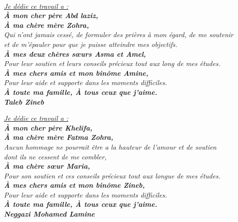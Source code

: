 \documentclass[12pt]{report}
\begin{document}
\newpage

\vspace*{0.1in}

\thispagestyle{empty}

\let\clearpage\relax

\begin{center}
    \textit{\fontsize{34}{46}{\bfseries{\color{Blue}{Dédicace}}}}
    \\
    \vspace{0.2in}
    \itshape
    \Large{\underline{Je dédie ce travail a :}}\\          \textbf{\large{À mon cher père Abd laziz,}}\\\vspace{-0.1in}
    \textbf{\large{À ma chère mère Zohra,}}\\
    \large{Qui n'ont jamais cessé, de formuler des prières à mon égard, de me soutenir\\\vspace{-0.1in}et de m'épauler pour que je puisse atteindre mes objectifs.}\\
    \textbf{\large{À mes deux chères sœurs Asma et Amel,}}\\
    \large{Pour leur soutien et leurs conseils précieux tout aux long de mes études.}\\
    \textbf{\large{À mes chers amis et mon binôme Amine,}}\\
    \large{Pour leur aide et supporte dans les moments difficiles.}\\
    \textbf{\large{À toute ma famille, À tous ceux que j’aime.}}\\\vspace{0.1in}
    \hfill\textbf{\Large{Taleb Zineb}}

    \vspace{0.2in}
    \itshape
    \Large{\underline{Je dédie ce travail a :}}\\          \textbf{\large{À mon cher père Khelifa,}}\\\vspace{-0.1in}
    \textbf{\large{À ma chère mère Fatma Zohra,}}\\
    \large{Aucun hommage ne pourrait être a la hauteur de l’amour et de soutien\\\vspace{-0.1in}dont ils ne cessent de me combler,}\\
    \textbf{\large{À ma chère sœur Maria,}}\\
    \large{Pour son soutien et ces conseils précieux tout aux longue de mes études.}\\
    \textbf{\large{À mes chers amis et mon binôme Zineb,}}\\
    \large{Pour leur aide et supporte dans les moments difficiles.}\\
    \textbf{\large{À toute ma famille, À tous ceux que j’aime.}}\\\vspace{0.1in}
    \hfill\textbf{\Large{Neggazi Mohamed Lamine}}


\end{center}
\end{document}
